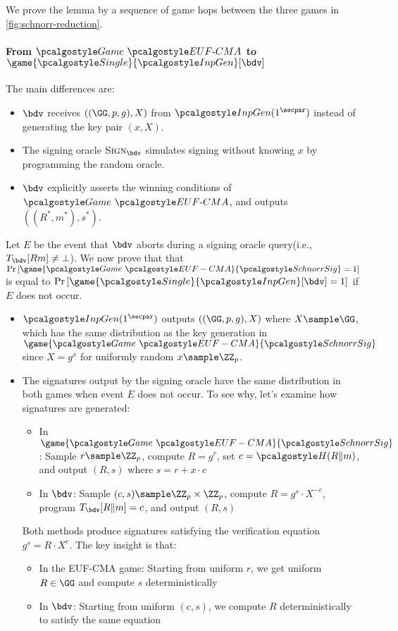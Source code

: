\ifsolutions
\begin{mysolution}
  We prove the lemma by a sequence of game hops between the three games in \autoref{fig:schnorr-reduction}.

  \paragraph{From $\Game~\algo{EUF\text{-}CMA}$ to $\game{\algo{Single}}{\algo{InpGen}}[\bdv]$}
  The main differences are:
  \begin{itemize}
    \item $\bdv$ receives $((\GG, p, g), X)$ from $\algo{InpGen}(1^\secpar)$ instead of generating the key pair $(x, X)$.
    \item The signing oracle $\pcoracle{Sign}_{\bdv}$ simulates signing without knowing $x$ by programming the random oracle.
    \item $\bdv$ explicitly asserts the winning conditions of $\Game~\algo{EUF\text{-}CMA}$, and outputs $((R^*, m^*), s^*)$.
  \end{itemize}

  Let $E$ be the event that $\bdv$ aborts during a signing oracle query(i.e., $T_{\bdv}[R  m] \neq \bot$).
  We now prove that that $\pr{\game{\Game~\algo{EUF-CMA}}{\algo{SchnorrSig}} = 1}$ is equal to $\pr{\game{\algo{Single}}{\algo{InpGen}}[\bdv] = 1}$ if $E$ does not occur.
  \begin{itemize}
    \item $\algo{InpGen}(1^\secpar)$ outputs $((\GG, p, g), X)$ where $X \sample \GG$, which has the same distribution as the key generation in $\game{\Game~\algo{EUF-CMA}}{\algo{SchnorrSig}}$ since $X = g^x$ for uniformly random $x \sample \ZZ_p$.
    \item The signatures output by the signing oracle have the same distribution in both games when event $E$ does not occur. To see why, let's examine how signatures are generated:
    \begin{itemize}
      \item In $\game{\Game~\algo{EUF-CMA}}{\algo{SchnorrSig}}$: Sample $r \sample \ZZ_p$, compute $R = g^r$, set $c = \algo{H}(R \| m)$, and output $(R,
  s)$ where $s = r + x \cdot c$
      \item In $\bdv$: Sample $(c, s) \sample \ZZ_p \times \ZZ_p$, compute $R = g^s \cdot X^{-c}$, program $T_{\bdv}[R \| m] = c$, and output $(R, s)$
    \end{itemize}

    Both methods produce signatures satisfying the verification equation $g^s = R \cdot X^c$. The key insight is that:
    \begin{itemize}
      \item In the EUF-CMA game: Starting from uniform $r$, we get uniform $R \in \GG$ and compute $s$ deterministically
      \item In $\bdv$: Starting from uniform $(c, s)$, we compute $R$ deterministically to satisfy the same equation
    \end{itemize}


\end{itemize}
\end{mysolution}
